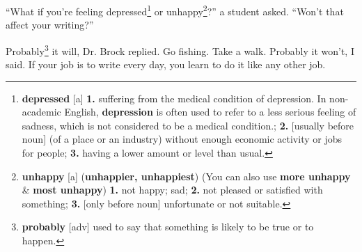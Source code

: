 \documentclass[oneside]{book}
\numberwithin{equation}{section}
\begin{document}
``What if you're feeling depressed\footnote{\textbf{depressed} [a] \textbf{1.} suffering from the medical condition of depression. In non-academic English, \textbf{depression} is often used to refer to a less serious feeling of sadness, which is not considered to be a medical condition.; \textbf{2.} [usually before noun] (of a place or an industry) without enough economic activity or jobs for people; \textbf{3.} having a lower amount or level than usual.} or unhappy\footnote{\textbf{unhappy} [a] (\textbf{unhappier, unhappiest}) (You can also use \textbf{more unhappy} \& \textbf{most unhappy}) \textbf{1.} not happy; sad; \textbf{2.} not pleased or satisfied with something; \textbf{3.} [only before noun] unfortunate or not suitable.}?'' a student asked. ``Won't that affect your writing?''

Probably\footnote{\textbf{probably} [adv] used to say that something is likely to be true or to happen.} it will, Dr. Brock replied. Go fishing. Take a walk. Probably it won't, I said. If your job is to write every day, you learn to do it like any other job.
\end{document}
